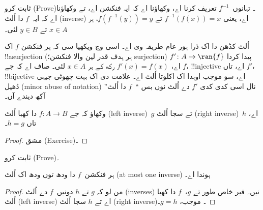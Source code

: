 \documentclass[../../../include/open-logic-section]{subfiles}
\begin{document}
\begin{prob}
 ثابت کرو (Prove)۔
تہانوں~$f^{-1}$ تعریف کرنا اے، وکھاؤنا اے کہ ایہ فنکشن اے، تے
وکھاؤنا اے کہ ایہ~$f$ دا اُلٹ (inverse) اے، یعنی
$f^{-1}(f(x)) = x$ تے
$f(f^{-1}(y)) = y$، ہر $x \in A$ تے $y \in B$ لئی۔
\end{prob}

\begin{explain}
اُلٹ کڈھن دا اک ذرا ہور عام طریقہ وی اے۔ اسی  وچ
ویکھیا سی کہ ہر فنکشن $f$ اک !!a{surjection} (ہر ہدف قدر لین والا
فنکشن؛ surjection)
$f' \colon A \to \ran{f}$ پیدا کردا اے، $f'(x) = f(x)$ رکھ کے ہر
$x \in A$ لئی۔ صاف اے
کہ جے $f$، !!{injective} اے، تاں $f'$، !!{bijective} اے، سو
 موجب اوہدا اک اکلوتا اُلٹ اے۔ علامت
دی اک بہت چھوٹی جیہی ڈھیل (minor abuse of notation) نال اسی کدی
کدی $f'$ دے اُلٹ نوں بس ``~$f$ دا اُلٹ'' آکھ دیندے آں۔
\end{explain}

\begin{prop}%
  وکھاؤ کہ جے $f\colon A \to B$ دا کھبا اُلٹ (left inverse)~$g$
  تے سجا اُلٹ (right inverse)~$h$ اے، تاں $h = g$۔
\end{prop}

\begin{proof}
  مشق (Exercise)۔
\end{proof}

\begin{prob}
   ثابت کرو (Prove)۔
\end{prob}

\begin{prop}
ہر فنکشن~$f$ دا ودھ توں ودھ اک اُلٹ (at most one inverse) ہوندا اے۔
\end{prop}

\begin{proof}
  من لو کہ $g$ تے $h$ دونیں~$f$ دے اُلٹ (inverses) نیں۔ فیر خاص
  طور تے $g$،~$f$ دا کھبا اُلٹ (left inverse) اے تے $h$ سجا اُلٹ
  (right inverse)۔
   موجب، $g = h$۔
\end{proof}
\end{document}
